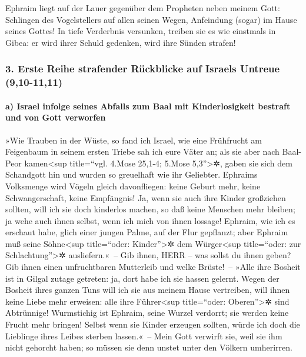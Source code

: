  Ephraim liegt auf der Lauer gegenüber dem Propheten neben
meinem Gott: Schlingen des Vogelstellers auf allen seinen Wegen,
Anfeindung (sogar) im Hause seines Gottes!  In tiefe
Verderbnis versunken, treiben sie es wie einstmals in Gibea: er wird
ihrer Schuld gedenken, wird ihre Sünden strafen!

\hypertarget{erste-reihe-strafender-ruxfcckblicke-auf-israels-untreue-910-1111}{%
\subsubsection{3. Erste Reihe strafender Rückblicke auf Israels Untreue
(9,10-11,11)}\label{erste-reihe-strafender-ruxfcckblicke-auf-israels-untreue-910-1111}}

\hypertarget{a-israel-infolge-seines-abfalls-zum-baal-mit-kinderlosigkeit-bestraft-und-von-gott-verworfen}{%
\paragraph{a) Israel infolge seines Abfalls zum Baal mit Kinderlosigkeit
bestraft und von Gott
verworfen}\label{a-israel-infolge-seines-abfalls-zum-baal-mit-kinderlosigkeit-bestraft-und-von-gott-verworfen}}

 »Wie Trauben in der Wüste, so fand ich Israel, wie eine
Frühfrucht am Feigenbaum in seinem ersten Triebe sah ich eure Väter an;
als sie aber nach Baal-Peor kamen\textless sup title=``vgl. 4.Mose
25,1-4; 5.Mose 5,3''\textgreater✲, gaben sie sich dem Schandgott hin und
wurden so greuelhaft wie ihr Geliebter.  Ephraims
Volksmenge wird Vögeln gleich davonfliegen: keine Geburt mehr, keine
Schwangerschaft, keine Empfängnis!  Ja, wenn sie auch
ihre Kinder großziehen sollten, will ich sie doch kinderlos machen, so
daß keine Menschen mehr bleiben; ja wehe auch ihnen selbst, wenn ich
mich von ihnen lossage!  Ephraim, wie ich es erschaut
habe, glich einer jungen Palme, auf der Flur gepflanzt; aber Ephraim muß
seine Söhne\textless sup title=``oder: Kinder''\textgreater✲ dem
Würger\textless sup title=``oder: zur Schlachtung''\textgreater✲
ausliefern.«~--  Gib ihnen, HERR -- was sollst du ihnen
geben? Gib ihnen einen unfruchtbaren Mutterleib und welke Brüste!~--
 »Alle ihre Bosheit ist in Gilgal zutage getreten: ja,
dort habe ich sie hassen gelernt. Wegen der Bosheit ihres ganzen Tuns
will ich sie aus meinem Hause vertreiben, will ihnen keine Liebe mehr
erweisen: alle ihre Führer\textless sup title=``oder:
Oberen''\textgreater✲ sind Abtrünnige!  Wurmstichig ist
Ephraim, seine Wurzel verdorrt; sie werden keine Frucht mehr bringen!
Selbst wenn sie Kinder erzeugen sollten, würde ich doch die Lieblinge
ihres Leibes sterben lassen.«~--  Mein Gott verwirft sie,
weil sie ihm nicht gehorcht haben; so müssen sie denn unstet unter den
Völkern umherirren.

